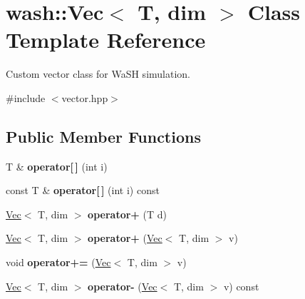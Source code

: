\hypertarget{classwash_1_1Vec}{}\section{wash\+:\+:Vec$<$ T, dim $>$ Class Template Reference}
\label{classwash_1_1Vec}


Custom vector class for Wa\+SH simulation.  




{\ttfamily \#include $<$vector.\+hpp$>$}

\subsection*{Public Member Functions}
\begin{DoxyCompactItemize}
\item 
\mbox{\label{classwash_1_1Vec_ac9bf604894ed27189131909371e5af70}} 
T \& {\bfseries operator\mbox{[}$\,$\mbox{]}} (int i)
\item 
\mbox{\label{classwash_1_1Vec_a751a7a202ad5e726937568887700a954}} 
const T \& {\bfseries operator\mbox{[}$\,$\mbox{]}} (int i) const
\item 
\mbox{\label{classwash_1_1Vec_ad8a8863138b26c2b2eae41e11f40e78f}} 
\mbox{\hyperlink{classwash_1_1Vec}{Vec}}$<$ T, dim $>$ {\bfseries operator+} (T d)
\item 
\mbox{\label{classwash_1_1Vec_a951a842c43b3cf99d60abfe73e53475c}} 
\mbox{\hyperlink{classwash_1_1Vec}{Vec}}$<$ T, dim $>$ {\bfseries operator+} (\mbox{\hyperlink{classwash_1_1Vec}{Vec}}$<$ T, dim $>$ v)
\item 
\mbox{\label{classwash_1_1Vec_ac92d90da0a36cdd6b38a8a12e341fa84}} 
void {\bfseries operator+=} (\mbox{\hyperlink{classwash_1_1Vec}{Vec}}$<$ T, dim $>$ v)
\item 
\mbox{\label{classwash_1_1Vec_a83a86542f9afb7ea0b5b7b8ab72eb119}} 
\mbox{\hyperlink{classwash_1_1Vec}{Vec}}$<$ T, dim $>$ {\bfseries operator-\/} (\mbox{\hyperlink{classwash_1_1Vec}{Vec}}$<$ T, dim $>$ v) const
\item 
\mbox{\label{classwash_1_1Vec_a972cde51776de1a9efec7ed6ea02f401}} 

\end{DoxyCompactItemize}
